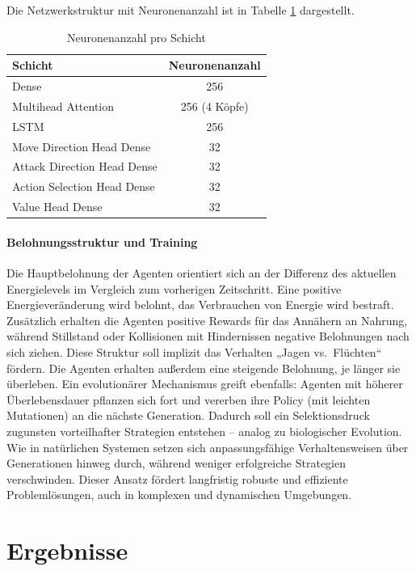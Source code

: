Die Netzwerkstruktur mit Neuronenanzahl ist in Tabelle \ref{tab:neuronenanzahl_marl} dargestellt.

\begin{table}[htbp]
\centering
\caption{Neuronenanzahl pro Schicht}
\label{tab:neuronenanzahl_marl}
\begin{tabular}{lc}
\toprule
Schicht & Neuronenanzahl \\
\midrule
Dense & 256 \\
Multihead Attention & 256 (4 Köpfe) \\
LSTM & 256 \\
Move Direction Head Dense & 32 \\
Attack Direction Head Dense & 32 \\
Action Selection Head Dense & 32 \\
Value Head Dense & 32 \\
\bottomrule
\end{tabular}
\end{table}


\paragraph{Belohnungsstruktur und Training}
Die Hauptbelohnung der Agenten orientiert sich an der Differenz des aktuellen Energielevels im Vergleich zum vorherigen Zeitschritt. Eine positive Energieveränderung wird belohnt, das Verbrauchen von Energie wird bestraft. Zusätzlich erhalten die Agenten positive Rewards für das Annähern an Nahrung, während Stillstand oder Kollisionen mit Hindernissen negative Belohnungen nach sich ziehen. Diese Struktur soll implizit das Verhalten „Jagen vs.\ Flüchten“ fördern. Die Agenten erhalten außerdem eine steigende Belohnung, je länger sie überleben. Ein evolutionärer Mechanismus greift ebenfalls: Agenten mit höherer Überlebensdauer pflanzen sich fort und vererben ihre Policy (mit leichten Mutationen) an die nächste Generation. Dadurch soll ein Selektionsdruck zugunsten vorteilhafter Strategien entstehen – analog zu biologischer Evolution. Wie in natürlichen Systemen setzen sich anpassungsfähige Verhaltensweisen über Generationen hinweg durch, während weniger erfolgreiche Strategien verschwinden. Dieser Ansatz fördert langfristig robuste und effiziente Problemlösungen, auch in komplexen und dynamischen Umgebungen.

\section{Ergebnisse}

